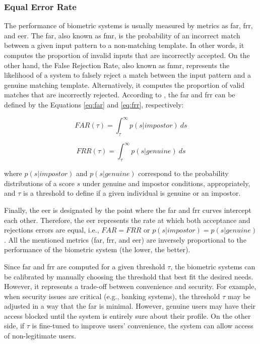 \subsubsection{Equal Error Rate}

The performance of biometric systems is usually measured by metrics as \acf{far}, \acf{frr}, and \acf{eer}. The \acl{far}, also known as \acf{fmr}, is the probability of an incorrect match between a given input pattern to a non-matching template. In other words, it computes the proportion of invalid inputs that are incorrectly accepted. On the other hand, the False Rejection Rate, also known as \acf{fnmr}, represents the likelihood of a system to falsely reject a match between the input pattern and a genuine matching template. Alternatively, it computes the proportion of valid matches that are incorrectly rejected. According to \cite{ross2006handbook}, the \acs{far} and \acs{frr} can be defined by the Equations \ref{eq:far} and \ref{eq:frr}, respectively:

\begin{equation}
\label{eq:far}
FAR(\tau) = \int_{\tau}^{\infty} p(s|impostor)\ ds
\end{equation}

\begin{equation}
\label{eq:frr}
FRR(\tau) = \int_{\tau}^{\infty} p(s|genuine)\ ds
\end{equation}

\noindent
where $p(s|impostor)$ and $p(s|genuine)$ correspond to the probability distributions of a score $s$ under genuine and impostor conditions, appropriately, and $\tau$ is a threshold to define if a given individual is genuine or an impostor.

Finally, the \acs{eer} is designated by the point where the \acs{far} and \acs{frr} curves intercept each other. Therefore, the \acs{eer} represents the rate at which both acceptance and rejections errors are equal, i.e., $FAR = FRR$ or $p(s|impostor) = p(s|genuine)$. All the mentioned metrics (\acs{far}, \acs{frr}, and \acs{eer}) are inversely proportional to the performance of the biometric system (the lower, the better).

Since \acs{far} and \acs{frr} are computed for a given threshold $\tau$, the biometric systems can be calibrated by manually choosing the threshold that best fit the desired needs. However, it represents a trade-off between convenience and security. For example, when security issues are critical (e.g., banking systems), the threshold $\tau$ may be adjusted in a way that the \acs{far} is minimal. However, genuine users may have their access blocked until the system is entirely sure about their profile. On the other side, if $\tau$ is fine-tuned to improve users' convenience, the system can allow access of non-legitimate users.

